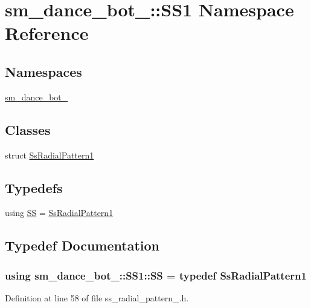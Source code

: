 \hypertarget{namespacesm__dance__bot__2_1_1SS1}{}\section{sm\+\_\+dance\+\_\+bot\+\_\+:\+:S\+S1 Namespace Reference}
\label{namespacesm__dance__bot__2_1_1SS1}
\subsection*{Namespaces}
\begin{DoxyCompactItemize}
\item 
 \hyperlink{namespacesm__dance__bot__2_1_1SS1_1_1sm__dance__bot__2}{sm\+\_\+dance\+\_\+bot\+\_}
\end{DoxyCompactItemize}
\subsection*{Classes}
\begin{DoxyCompactItemize}
\item 
struct \hyperlink{structsm__dance__bot__2_1_1SS1_1_1SsRadialPattern1}{Ss\+Radial\+Pattern1}
\end{DoxyCompactItemize}
\subsection*{Typedefs}
\begin{DoxyCompactItemize}
\item 
using \hyperlink{namespacesm__dance__bot__2_1_1SS1_a01643449f4dda719d7f3a47d09453ed0}{SS} = \hyperlink{structsm__dance__bot__2_1_1SS1_1_1SsRadialPattern1}{Ss\+Radial\+Pattern1}
\end{DoxyCompactItemize}


\subsection{Typedef Documentation}
\subsubsection[{\texorpdfstring{SS}{SS}}]{\setlength{\rightskip}{0pt plus 5cm}using {\bf sm\+\_\+dance\+\_\+bot\+\_\+::\+S\+S1\+::\+SS} = typedef {\bf Ss\+Radial\+Pattern1}}\hypertarget{namespacesm__dance__bot__2_1_1SS1_a01643449f4dda719d7f3a47d09453ed0}{}\label{namespacesm__dance__bot__2_1_1SS1_a01643449f4dda719d7f3a47d09453ed0}


Definition at line 58 of file ss\+\_\+radial\+\_\+pattern\+\_.\+h.

